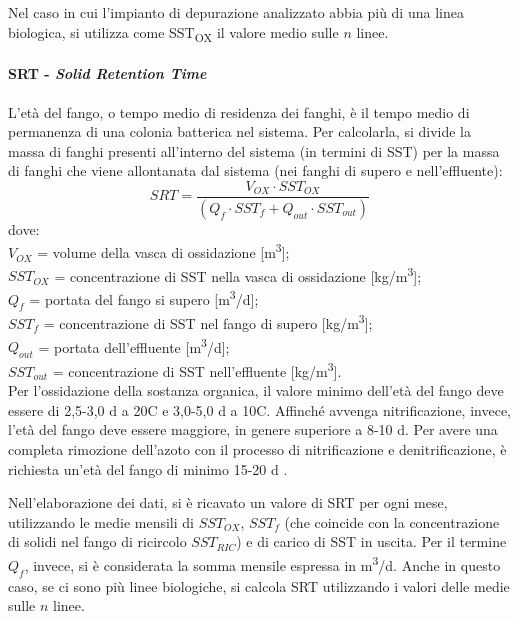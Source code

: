 Nel caso in cui l'impianto di depurazione analizzato abbia più di una linea biologica, si utilizza come SST\textsubscript{OX} il valore medio sulle $n$ linee. 
\paragraph*{SRT - \textit{Solid Retention Time}}
L'età del fango, o tempo medio di residenza dei fanghi, è il tempo medio di permanenza di una colonia batterica nel sistema. Per calcolarla, si divide la massa di fanghi presenti all'interno del sistema (in termini di SST) per la massa di fanghi che viene allontanata dal sistema (nei fanghi di supero e nell'effluente):
\begin{equation}
SRT=\frac{V_{OX}\cdot SST_{OX}}{(Q_{f}\cdot SST_{f}+Q_{out}\cdot SST_{out})}
\end{equation}
\label{eq:SRT}
dove:\\
$V_{OX}$ = volume della vasca di ossidazione [m\textsuperscript{3}];\\
$SST_{OX}$ = concentrazione di SST nella vasca di ossidazione [kg/m\textsuperscript{3}];\\
$Q_{f}$ = portata del fango si supero [m\textsuperscript{3}/d];\\
$SST_{f}$ = concentrazione di SST nel fango di supero [kg/m\textsuperscript{3}];\\
$Q_{out}$ = portata dell'effluente [m\textsuperscript{3}/d];\\
$SST_{out}$ = concentrazione di SST nell'effluente [kg/m\textsuperscript{3}].\\

Per l'ossidazione della sostanza organica, il valore minimo dell'età del fango deve essere di 2,5-3,0 d a 20\textdegree C e 3,0-5,0 d a 10\textdegree C. Affinché avvenga nitrificazione, invece, l'età del fango deve essere maggiore, in genere superiore a 8-10 d. Per avere una completa rimozione dell'azoto con il processo di nitrificazione e denitrificazione, è richiesta un'età del fango di minimo 15-20 d \cite{collivignarelli2012ingegneria}.

Nell'elaborazione dei dati, si è ricavato un valore di SRT per ogni mese, utilizzando le medie mensili di $SST_{OX}$, $SST_{f}$ (che coincide con la concentrazione di solidi nel fango di ricircolo $SST_{RIC}$) e di carico di SST in uscita. Per il termine $Q_{f}$, invece, si è considerata la somma mensile espressa in m\textsuperscript{3}/d. Anche in questo caso, se ci sono più linee biologiche, si calcola SRT utilizzando i valori delle medie sulle $n$ linee.

